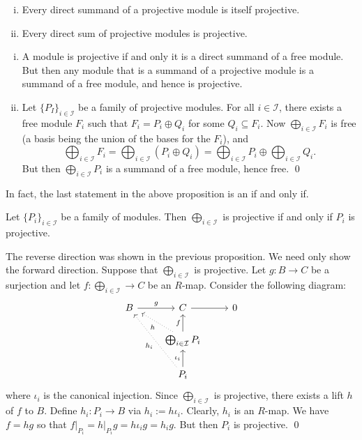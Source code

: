 \begin{prop} \hfill
\begin{enumerate}[(i)]
\item Every direct summand of a projective module is itself projective.
\item Every direct sum of projective modules is projective.
\end{enumerate}
\end{prop}

\pf
\begin{enumerate}[(i)] 
\item A module is projective if and only it is a direct summand of a free module. But then any module that is a summand of a projective module is a summand of a free module, and hence is projective.
\item Let $\{P_I\}_{i \in \mathcal{I}}$ be a family of projective modules. For all $i \in \mathcal{I}$, there exists a free module $F_i$ such that $F_i= P_i \oplus Q_i$ for some $Q_i \subseteq F_i$. Now $\bigoplus_{i \in \mathcal{I}} F_i$ is free (a basis being the union of the bases for the $F_i$), and
	\[
	\bigoplus_{i \in \mathcal{I}} F_i = \bigoplus_{i \in \mathcal{I}} (P_i \oplus Q_i)= \bigoplus_{i \in \mathcal{I}} P_i \oplus \bigoplus_{i \in \mathcal{I}} Q_i. 
	\]
But then $\bigoplus_{i \in \mathcal{I}} P_i$ is a summand of a free module, hence free. \qed \\
\end{enumerate}

In fact, the last statement in the above proposition is an if and only if.


\begin{prop}
Let $\{P_i\}_{i \in \mathcal{I}}$ be a family of modules. Then $\bigoplus_{i \in \mathcal{I}}$ is projective if and only if $P_i$ is projective. 
\end{prop}

\pf The reverse direction was shown in the previous proposition. We need only show the forward direction. Suppose that $\bigoplus_{i \in \mathcal{I}}$ is projective. Let $g: B \to C$ be a surjection and let $f: \bigoplus_{i \in \mathcal{I}} \to C$ be an $R$-map. Consider the following diagram:
	\[
	\begin{tikzcd}
	B \arrow{r}{g} & C \arrow{r} & 0 \\
	& \bigoplus_{i \in \mathcal{I}} P_i \arrow[xshift=1ex,dotted]{ul}{h} \arrow{u}{f} \\
	& P_i \arrow{u}{\iota_i} \arrow[dotted]{uul}{h_i}
	\end{tikzcd}
	\]
where $\iota_i$ is the canonical injection. Since $\bigoplus_{i \in \mathcal{I}}$ is projective, there exists a lift $h$ of $f$ to $B$. Define $h_i: P_i \to B$ via $h_i:= h\iota_i$. Clearly, $h_i$ is an $R$-map. We have $f=hg$ so that $f\big|_{P_i}=h\big|_{P_i}g=h\iota_ig=h_ig$. But then $P_i$ is projective. \qed \\


